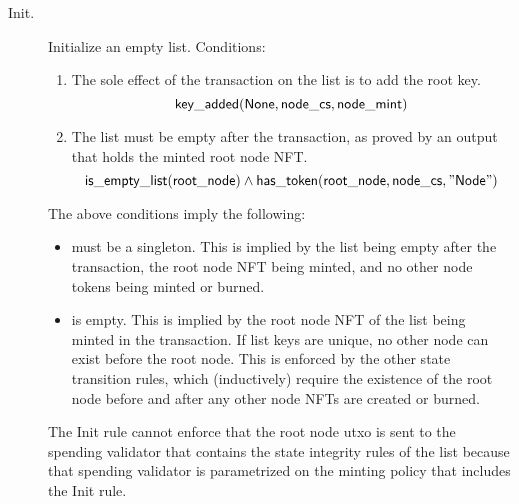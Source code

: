 \documentclass[../midgard.tex]{subfiles}
\begin{document}
\newcommand{\initSpendingValidatorWarning}[0]{
    \begin{warningblock}
        Offchain code for the list-initialization transaction MUST send the root node to the list's spending validator.
        Otherwise, the linked list can be corrupted.
    \end{warningblock}
}

\begin{description}
    \item[Init.] Initialize an empty list.
      Conditions:
        \begin{enumerate}
            \item The sole effect of the transaction on the list is to add the root key.
                \begin{equation*}
                    \mathsf{key\_added}(\mathsf{None}, \mathsf{node\_cs}, \mathsf{node\_mint})
                \end{equation*}
            
            \item The list must be empty after the transaction, as proved by an output  that holds the minted root node NFT.
                \begin{equation*}
                    \mathsf{is\_empty\_list}(\mathsf{root\_node})  \land
                    \mathsf{has\_token}(\mathsf{root\_node}, \mathsf{node\_cs}, \mathsf{"Node"})
                \end{equation*}
        \end{enumerate}
        The above conditions imply the following:
        \begin{itemize}
            \item {} must be a singleton.
              This is implied by the list being empty after the transaction, the root node NFT being minted, and no other node tokens being minted or burned.
            \item {} is empty.
              This is implied by the root node NFT of the list being minted in the transaction.
              If list keys are unique, no other node can exist before the root node.
              This is enforced by the other state transition rules, which (inductively) require the existence of the root node before and after any other node NFTs are created or burned.
        \end{itemize}
        
        The Init rule cannot enforce that the root node utxo is sent to the spending validator that contains the state integrity rules of the list because that spending validator is parametrized on the minting policy that includes the Init rule.
        

\end{description}
\end{document}
